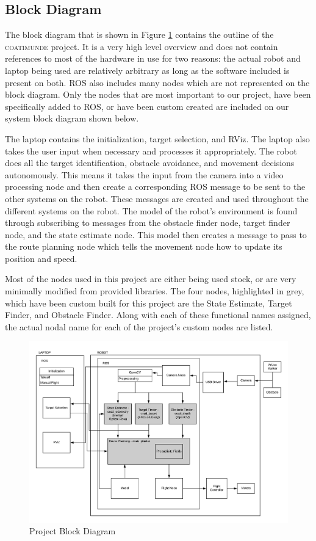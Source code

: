 \documentclass{article}[12]
\begin{document}
	\subsection{Block Diagram}
	
	The block diagram that is shown in Figure \ref{fig:blockdiagram} contains the outline of the \textsc{coatimunde} project. It is a very high level overview and does not contain references to most of the hardware in use for two reasons: the actual robot and laptop being used are relatively arbitrary as long as the software included is present on both. ROS also includes many nodes which are not represented on the block diagram. Only the nodes that are most important to our project, have been specifically added to ROS, or have been custom created are included on our system block diagram shown below.
	
	The laptop contains the initialization, target selection, and RViz. The laptop also takes the user input when necessary and processes it appropriately.  The robot does all the target identification, obstacle avoidance, and movement decisions autonomously. This means it takes the input from the camera into a video processing node and then create a corresponding ROS message to be sent to the other systems on the robot. These messages are created and used throughout the different systems on the robot. The model of the robot's environment is found through subscribing to messages from the obstacle finder node, target finder node, and the state estimate node. This model then creates a message to pass to the route planning node which tells the movement node how to update its position and speed. 
	
	Most of the nodes used in this project are either being used stock, or are very minimally modified from provided libraries. The four nodes, highlighted in grey, which have been custom built for this project are the State Estimate, Target Finder, and Obstacle Finder. Along with each of these functional names assigned, the actual nodal name for each of the project's custom nodes are listed.

	\begin{figure}[H]
		\centering
		\includegraphics[width=\linewidth]{BlockDiagram}
		\caption{Project Block Diagram}
		\label{fig:blockdiagram}
	\end{figure}
\end{document}
